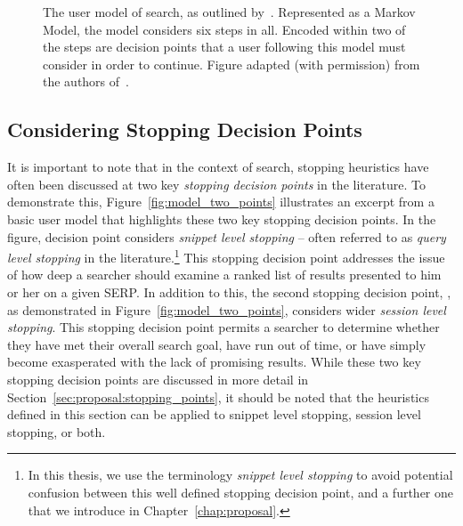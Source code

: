 \begin{figure}[t!]
    \centering
    \caption[Markov model of the search process by~\cite{baskaya2013behavioural_factors}]{The user model of search, as outlined by~\citealt{baskaya2013behavioural_factors}. Represented as a Markov Model, the model considers six steps in all. Encoded within two of the steps are decision points that a user following this model must consider in order to continue. Figure adapted (with permission) from the authors of~\citealt{baskaya2013behavioural_factors}.}
    \label{fig:baskaya_model}
\end{figure}

\subsection{Considering Stopping Decision Points}
It is important to note that in the context of search, stopping heuristics have often been discussed at two key \emph{stopping decision points} in the literature. To demonstrate this, Figure~\ref{fig:model_two_points} illustrates an excerpt from a basic user model that highlights these two key stopping decision points. In the figure, decision point  considers \emph{snippet level stopping} -- often referred to as \emph{query level stopping} in the literature.\footnote{In this thesis, we use the terminology \emph{snippet level stopping} to avoid potential confusion between this well defined stopping decision point, and a further one that we introduce in Chapter~\ref{chap:proposal}.} This stopping decision point addresses the issue of how deep a searcher should examine a ranked list of results presented to him or her on a given SERP. In addition to this, the second stopping decision point, , as demonstrated in Figure~\ref{fig:model_two_points}, considers wider \emph{session level stopping}. This stopping decision point permits a searcher to determine whether they have met their overall search goal, have run out of time, or have simply become exasperated with the lack of promising results. While these two key stopping decision points are discussed in more detail in Section~\ref{sec:proposal:stopping_points}, it should be noted that the heuristics defined in this section can be applied to snippet level stopping, session level stopping, or both.

